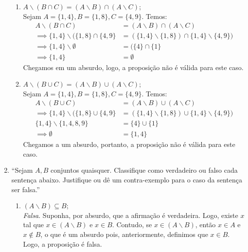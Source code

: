 \documentclass[13pt,letterpaper]{article}
\begin{document}
\begin{enumerate}
    \begin{enumerate}
        \item $A \backslash (B \cap C) = (A \backslash B) \cap (A \backslash C)$; \\
            Sejam $A = \{1, 4\}, B = \{1, 8\}, C = \{4, 9\}$. Temos:
            \begin{align*}
                A \backslash (B \cap C) &= (A \backslash B) \cap (A \backslash C) \\ \implies
                \{1, 4\} \backslash (\{1, 8\} \cap \{4, 9\} &= (\{1,4\} \backslash \{1, 8\}) \cap \{1,4\} \backslash \{4, 9\}) \\ 
                \implies
                \{1, 4\} \backslash \emptyset &= (\{4\} \cap \{1\} \\ 
                \implies 
                \{1, 4\} &= \emptyset
            \end{align*}
            Chegamos em um absurdo, logo, a proposição não é válida para este caso.
        \item $A \backslash (B \cup C) = (A \backslash B) \cup (A \backslash C)$; \\
        Sejam $A = \{1, 4\}, B = \{1, 8\}, C = \{4, 9\}$. Temos:
        \begin{align*}
            A \backslash (B \cup C) &= (A \backslash B) \cup (A \backslash C) \\
            \implies 
            \{1, 4\} \backslash (\{1, 8\} \cup \{4, 9\} &= (\{1,4\} \backslash \{1, 8\}) \cup \{1,4\} \backslash \{4, 9\}) \\ 
            \{1, 4\} \backslash \{1, 4, 8, 9 \} &= \{4\} \cup \{1\} \\ \implies
            \emptyset &= \{1, 4\}
        \end{align*}
        Chegamos a um absurdo, portanto, a proposição não é válida para este caso.
    \end{enumerate}
    \item \enquote{Sejam $A, B$ conjuntos quaisquer. Classifique como verdadeiro ou falso cada sentença abaixo. Justifique ou dê um contra-exemplo para o caso da sentença ser falsa.}
    \begin{enumerate}
        \item $(A \backslash B) \subseteq B$; \\
        \emph{Falsa}. Suponha, por absurdo, que a afirmação é verdadeira. Logo, existe $x$ tal que $x \in (A \backslash B)$ e $x \in B$. Contudo, se $x \in (A \backslash B)$, então $x \in A$ e $x \notin B$, o que é um absurdo pois, anteriormente, definimos que $x \in B$. Logo, a proposição é falsa.

\end{enumerate}
\end{enumerate}
\end{document}
